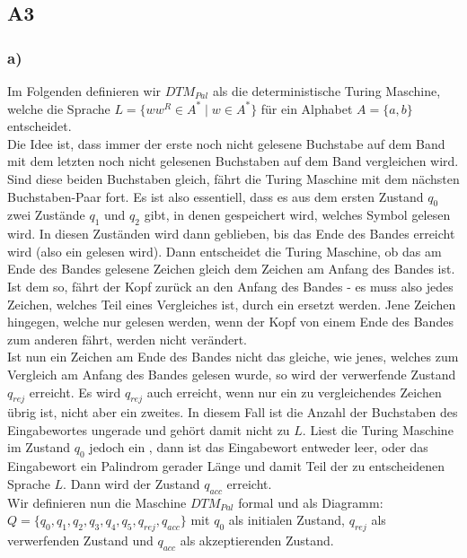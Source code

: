 \documentclass[12pt, a4paper]{article}
\begin{document}
\subsection*{A3}
\subsubsection*{a)}
Im Folgenden definieren wir \(DTM_{Pal}\) als die deterministische Turing Maschine, welche die Sprache \(L = \{ww^R \in A^* \mid w \in A^*\}\)
für ein Alphabet \(A = \{a,b\}\) entscheidet.\\
Die Idee ist, dass immer der erste noch nicht gelesene Buchstabe auf dem Band mit dem 
letzten noch nicht gelesenen Buchstaben auf dem Band vergleichen wird. Sind diese beiden 
Buchstaben gleich, fährt die Turing Maschine mit dem nächsten Buchstaben-Paar fort. Es ist also 
essentiell, dass es aus dem ersten Zustand \(q_0\) zwei Zustände \(q_1\) und \(q_2\) gibt, in 
denen gespeichert wird, welches Symbol gelesen wird. In diesen Zuständen wird dann geblieben, bis 
das Ende des Bandes erreicht wird (also ein \textvisiblespace gelesen wird). Dann entscheidet die 
Turing Maschine, ob das am Ende des Bandes gelesene Zeichen gleich dem Zeichen am Anfang des Bandes 
ist. Ist dem so, fährt der Kopf zurück an den Anfang des Bandes - es muss also jedes 
Zeichen, welches Teil eines Vergleiches ist, durch ein \textvisiblespace ersetzt werden. 
Jene Zeichen hingegen, welche nur gelesen werden, wenn der Kopf von einem Ende des Bandes zum 
anderen fährt, werden nicht verändert. \\
Ist nun ein Zeichen am Ende des Bandes nicht das gleiche, wie jenes, welches zum Vergleich am 
Anfang des Bandes gelesen wurde, so wird der verwerfende Zustand \(q_{rej}\) erreicht. Es wird \(q_{rej}\) auch 
erreicht, wenn nur ein zu vergleichendes Zeichen übrig ist, nicht aber ein zweites. In diesem 
Fall ist die Anzahl der Buchstaben des Eingabewortes ungerade und gehört damit nicht zu \(L\). Liest die 
Turing Maschine im Zustand \(q_0\) jedoch ein \textvisiblespace, dann ist das Eingabewort entweder 
leer, oder das Eingabewort ein Palindrom gerader Länge und damit Teil der zu entscheidenen Sprache \(L\). 
Dann wird der Zustand \(q_{acc}\) erreicht. \\
Wir definieren nun die Maschine \(DTM_{Pal}\) formal und als Diagramm: \\
\(Q = \{q_0, q_1, q_2, q_3, q_4, q_5, q_{rej}, q_{acc}\}\) mit \(q_0\) als initialen Zustand, 
\(q_{rej}\) als verwerfenden Zustand und \(q_{acc}\) als akzeptierenden Zustand.\\
\end{document}
